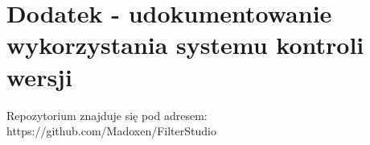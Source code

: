 \documentclass{article}
\begin{document}
\section{Dodatek - udokumentowanie wykorzystania systemu kontroli wersji}
Repozytorium znajduje się pod adresem: https://github.com/Madoxen/FilterStudio

\end{document}
